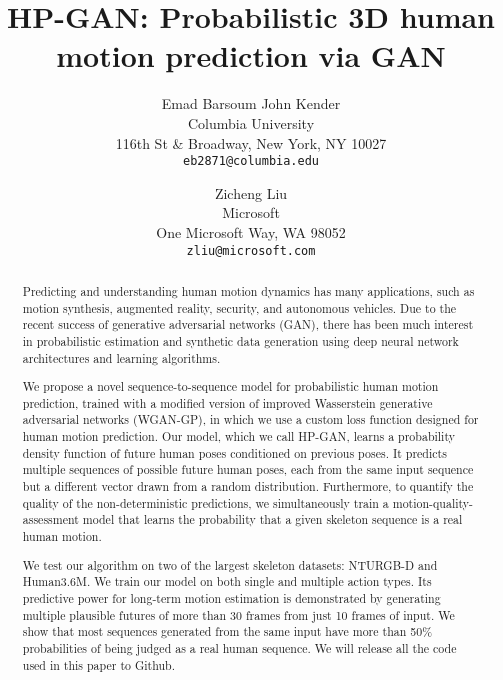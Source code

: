 \documentclass[10pt,twocolumn,letterpaper]{article}
\begin{document}
\title{HP-GAN: Probabilistic 3D human motion prediction via GAN}

\author{Emad Barsoum \qquad John Kender\\
Columbia University\\
116th St \& Broadway, New York, NY 10027\\
{\tt\small eb2871@columbia.edu} 
\and
Zicheng Liu\\
Microsoft\\
One Microsoft Way, WA 98052\\
{\tt\small zliu@microsoft.com}
}

\maketitle




\begin{abstract}

Predicting and understanding human motion dynamics has many applications, such as motion synthesis, augmented reality, security, and autonomous vehicles. Due to the recent success of generative adversarial networks (GAN), there has been much interest in probabilistic estimation and synthetic data generation using deep neural network architectures and learning algorithms.

We propose a novel sequence-to-sequence model for probabilistic human motion prediction, trained with a modified version of improved Wasserstein generative adversarial networks (WGAN-GP), in which we use a custom loss function designed for human motion prediction. Our
model, which we call HP-GAN, learns a probability density function of future human poses conditioned on previous poses. It predicts multiple sequences of possible future human poses, each from the same input sequence but a different vector  drawn from a random distribution. Furthermore, to quantify the quality of the non-deterministic predictions, we simultaneously train a motion-quality-assessment model that learns the probability that a given skeleton sequence is a real human motion.

We test our algorithm on two of the largest skeleton datasets: NTURGB-D and Human3.6M. We train our model on both single and multiple action types. Its predictive power for long-term motion estimation is demonstrated by generating multiple plausible futures of more than 30 frames from just 10 frames of input. We show that most sequences generated from the same input have more than 50\% probabilities of being judged as a real human sequence. We will release all the code used in this paper to Github.

\end{abstract}
\end{document}
